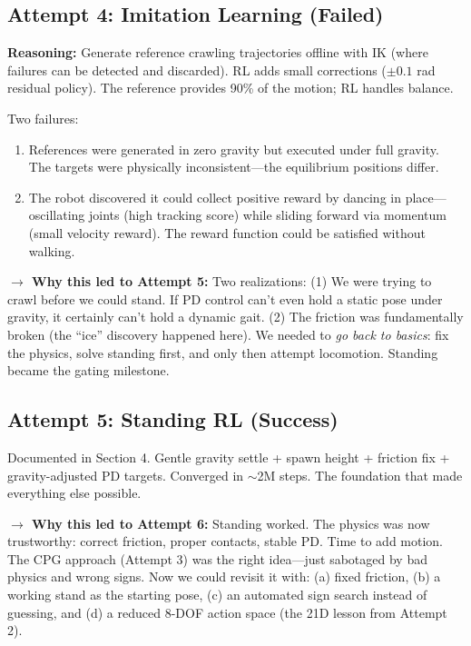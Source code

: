 \documentclass[11pt, a4paper]{article}
\begin{document}
\subsection{Attempt 4: Imitation Learning (Failed)}

\textbf{Reasoning:} Generate reference crawling trajectories offline with IK (where failures can be detected and discarded). RL adds small corrections ($\pm 0.1$ rad residual policy). The reference provides 90\% of the motion; RL handles balance.

\begin{failbox}
Two failures:
\begin{enumerate}[nosep]
\item References were generated in zero gravity but executed under full gravity. The targets were physically inconsistent---the equilibrium positions differ.
\item The robot discovered it could collect positive reward by dancing in place---oscillating joints (high tracking score) while sliding forward via momentum (small velocity reward). The reward function could be satisfied without walking.
\end{enumerate}
\end{failbox}

\noindent\textcolor{accentpurple}{\textbf{$\rightarrow$ Why this led to Attempt 5:}} Two realizations: (1) We were trying to crawl before we could stand. If PD control can't even hold a static pose under gravity, it certainly can't hold a dynamic gait. (2) The friction was fundamentally broken (the ``ice'' discovery happened here). We needed to \textit{go back to basics}: fix the physics, solve standing first, and only then attempt locomotion. Standing became the gating milestone.

\subsection{Attempt 5: Standing RL (\textcolor{successgreen}{Success})}

Documented in Section 4. Gentle gravity settle + spawn height + friction fix + gravity-adjusted PD targets. Converged in $\sim$2M steps. The foundation that made everything else possible.

\noindent\textcolor{accentpurple}{\textbf{$\rightarrow$ Why this led to Attempt 6:}} Standing worked. The physics was now trustworthy: correct friction, proper contacts, stable PD. Time to add motion. The CPG approach (Attempt 3) was the right idea---just sabotaged by bad physics and wrong signs. Now we could revisit it with: (a) fixed friction, (b) a working stand as the starting pose, (c) an automated sign search instead of guessing, and (d) a reduced 8-DOF action space (the 21D lesson from Attempt 2).
\end{document}
